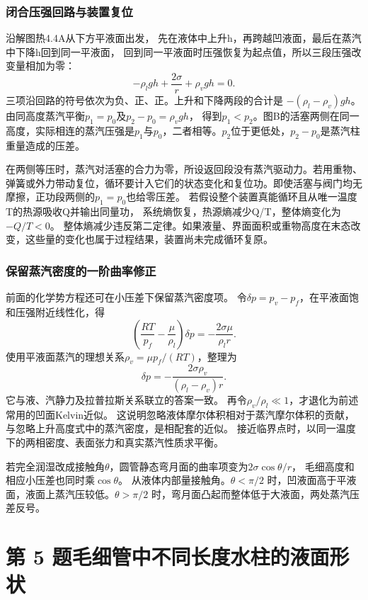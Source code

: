 \documentclass[UTF8,fontset=fandol,a4paper,11pt]{ctexart}
\begin{document}
\subsubsection*{闭合压强回路与装置复位}
沿解图热4.4A从下方平液面出发，
先在液体中上升h，再跨越凹液面，最后在蒸汽中下降h回到同一平液面，
回到同一平液面时压强恢复为起点值，所以三段压强改变量相加为零：
\[
-\rho_lgh+\frac{2\sigma}{r}+\rho_vgh=0.
\]
三项沿回路的符号依次为负、正、正。上升和下降两段的合计是 $-(\rho_l-\rho_v)gh$。
由同高度蒸汽平衡$p_1=p_0$及$p_2-p_0=\rho_vgh$，
得到$p_1<p_2$。图B的活塞两侧在同一高度，实际相连的蒸汽压强是$p_1$与$p_0$，二者相等。$p_2$位于更低处，$p_2-p_0$是蒸汽柱重量造成的压差。

在两侧等压时，蒸汽对活塞的合力为零，所设返回段没有蒸汽驱动力。若用重物、弹簧或外力带动复位，循环要计入它们的状态变化和复位功。即使活塞与阀门均无摩擦，正功段两侧的$p_1=p_0$也给零压差。
若假设整个装置真能循环且从唯一温度T的热源吸收Q并输出同量功，
系统熵恢复，热源熵减少Q/T，整体熵变化为$-Q/T<0$。
整体熵减少违反第二定律。如果液量、界面面积或重物高度在末态改变，这些量的变化也属于过程结果，装置尚未完成循环复原。

\subsubsection*{保留蒸汽密度的一阶曲率修正}
前面的化学势方程还可在小压差下保留蒸汽密度项。
令$\delta p=p_v-p_f$，在平液面饱和压强附近线性化，得
\[
\left(\frac{RT}{p_f}-\frac{\mu}{\rho_l}\right)\delta p
=-\frac{2\sigma\mu}{\rho_lr}.
\]
使用平液面蒸汽的理想关系$\rho_v=\mu p_f/(RT)$，整理为
\[
\delta p=-\frac{2\sigma\rho_v}{(\rho_l-\rho_v)r}.
\]
它与液、汽静力及拉普拉斯关系联立的答案一致。
再令$\rho_v/\rho_l\ll1$，才退化为前述常用的凹面Kelvin近似。
这说明忽略液体摩尔体积相对于蒸汽摩尔体积的贡献，与忽略上升高度式中的蒸汽密度，是相配套的近似。
接近临界点时，以同一温度下的两相密度、表面张力和真实蒸汽性质求平衡。

若完全润湿改成接触角$\theta$，圆管静态弯月面的曲率项变为$2\sigma\cos\theta/r$，
毛细高度和相应小压差也同时乘$\cos\theta$。
从液体内部量接触角。$\theta<\pi/2$ 时，凹液面高于平液面，液面上蒸汽压较低。$\theta>\pi/2$ 时，弯月面凸起而整体低于大液面，两处蒸汽压差反号。




\section*{第 5 题\quad 毛细管中不同长度水柱的液面形状}
\end{document}
